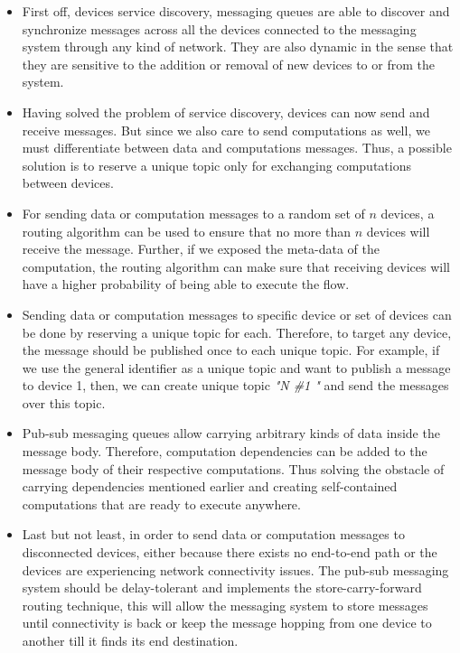 \begin{itemize}
\item First off, devices service discovery, messaging queues are able to discover and synchronize messages across all the devices connected to the messaging system through any kind of network.  They are also dynamic in the sense that they are sensitive to the addition or removal of new devices to or from the system. 

\item  Having solved the problem of service discovery, devices can now send and receive messages. But since we also care to send computations as well, we must differentiate between data  and computations messages. Thus, a possible solution is to reserve a unique topic only for exchanging computations between devices.

\item For sending data or computation messages to a random set of  \(n\) devices, a routing algorithm can be used to ensure that no more than \(n\) devices will receive the message. Further, if we exposed the meta-data of the computation, the routing algorithm can make sure that receiving devices will have a higher probability of being able to execute the flow.

\item Sending data or computation messages to specific device or set of devices can be done by reserving a unique topic for each. Therefore, to target any device, the message should be published once to each unique topic. For example, if we use the general identifier as a unique topic and want to publish a message to device 1, then, we can create  unique topic \textit{"N \#1 "} and send the messages over this topic.

 
\item Pub-sub messaging queues allow carrying arbitrary kinds of data inside the message body. Therefore, computation dependencies can be  added to the message body of their respective computations. Thus solving the obstacle of carrying dependencies mentioned earlier and creating self-contained computations that are ready to execute anywhere.

\item Last but not least, in order to send data or computation messages to disconnected devices, either because there exists no end-to-end path or the devices are experiencing network connectivity issues. The pub-sub messaging system should be delay-tolerant and implements the store-carry-forward routing technique, this will allow the messaging system to store messages until connectivity is back or keep the message hopping from one device to another till it finds its end destination.
\end{itemize}

